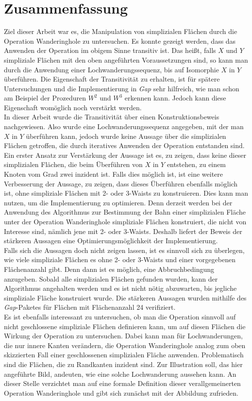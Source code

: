 \documentclass[12pt,titlepage,twoside,cleardoublepage]{article}
\theoremstyle{nummermitklammern}
\numberwithin{equation}{section}
\begin{document}
\section{Zusammenfassung}
Ziel dieser Arbeit war es, die Manipulation von simplizialen Flächen durch die Operation Wanderinghole zu untersuchen. Es konnte gezeigt werden, dass das Anwenden der Operation im obigem Sinne transitiv ist. Das heißt, falls $X$ und $Y$ simpliziale Flächen mit den oben angeführten Voraussetzungen sind, so kann man durch die Anwendung einer Lochwanderungssequenz, bis auf Isomorphie $X$ in $Y$ überführen. Die Eigenschaft der Transitivität zu erhalten, ist für spätere Untersuchungen und die Implementierung in \emph{Gap} sehr hilfreich, wie man schon am Beispiel der Prozeduren $W^2$ und $W^3$ erkennen kann. Jedoch kann diese Eigenschaft womöglich noch verstärkt werden.\\
In dieser Arbeit wurde die Transitivität über einen Konstruktionsbeweis nachgewiesen. Also wurde eine Lochwanderungssequenz angegeben, mit der man $X$ in $Y$ überführen kann, jedoch wurde keine Aussage über die simplizialen Flächen getroffen, die durch iteratives Anwenden der Operation entstanden sind. Ein erster Ansatz zur Verstärkung der Aussage ist es, zu zeigen, dass keine dieser simplizialen Flächen, die beim Überführen von $X$ in $Y$ entstehen, zu einem Knoten vom Grad zwei inzident ist. Falls dies möglich ist, ist eine weitere Verbesserung der Aussage, zu zeigen, dass dieses Überführen ebenfalls möglich ist, ohne simpliziale Flächen mit 2- oder 3-Waists zu konstruieren. Dies kann man nutzen, um die Implementierung zu optimieren. Denn derzeit werden bei der Anwendung des Algorithmus zur Bestimmung der Bahn einer simplizialen Fläche unter der  Operation Wanderinghole simpliziale Flächen konstruiert, die nicht von Interesse sind, nämlich jene mit 2- oder 3-Waists. Deshalb liefert der Beweis der stärkeren Aussagen eine Optimierungsmöglichkeit der Implementierung.\\
Falls sich die Aussagen doch nicht zeigen lassen, ist es sinnvoll sich zu überlegen, wie viele simpliziale Flächen es ohne 2- oder 3-Waists und einer vorgegebenen Flächenanzahl gibt. Denn dann ist es möglich, eine Abbruchbedingung anzugeben. Sobald alle simplizialen Flächen gefunden wurden, kann der Algorithmus angehalten werden und es ist nicht nötig abzuwarten, bis jegliche simpliziale Fläche konstruiert wurde. Die stärkeren Aussagen wurden mithilfe des \emph{Gap}-Paketes für Flächen mit Flächenanzahl 24 verifiziert.\\
Es ist ebenfalls interessant zu untersuchen, ob man die Operation sinnvoll auf nicht geschlossene simpliziale Flächen definieren kann, um auf diesen Flächen die Wirkung der Operation zu untersuchen. Dabei kann man für Lochwanderungen, die nur innere Kanten verändern, die Operation Wanderinghole analog zum oben skizzierten Fall einer geschlossenen simplizialen Fläche anwenden. Problematisch sind die Flächen, die zu Randkanten inzident sind. Zur Illustration soll, das hier angeführte Bild, andeuten, wie eine solche Lochwanderung aussehen kann. An dieser Stelle verzichtet man auf eine formale Definition dieser verallgemeinerten Operation Wanderinghole und gibt sich zunächst mit der Abbildung zufrieden.
\end{document}
